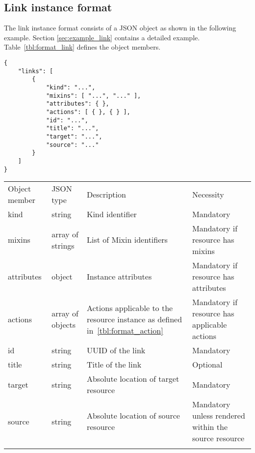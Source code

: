 \documentclass[10pt,a4paper]{article}
\begin{document}
\subsection{Link instance format}
\label{sec:format_link}

The link instance format consists of a JSON object as shown in the
following example. Section \ref{sec:example_link} contains a detailed example.
Table~\ref{tbl:format_link} defines the object members.
\begin{verbatim}
{
    "links": [
        {
            "kind": "...",
            "mixins": [ "...", "..." ],
            "attributes": { },
            "actions": [ { }, { } ],
            "id": "...",
            "title": "...",
            "target": "...",
            "source": "..."
        }
    ]
}
\end{verbatim}
 {
    \begin{tabular}{llp{5.0cm}p{3.0cm}}
    \toprule
    Object member & JSON type & Description & Necessity \\
    \colrule
    kind & string & Kind identifier & Mandatory \\

    mixins & array of strings & List of Mixin identifiers &
    Mandatory if resource has mixins \\

    attributes & object & Instance attributes & Mandatory if resource has attributes \\

    actions & array of objects & Actions applicable to the resource instance as defined in~\ref{tbl:format_action} &
    Mandatory if resource has applicable actions \\
    
    id & string & UUID of the link & Mandatory\\
        
    title & string & Title of the link & Optional\\
        
    target & string & Absolute location of target resource & Mandatory \\
    
    source & string & Absolute location of source resource & Mandatory unless rendered within the source resource\\
    \botrule
    \end{tabular}
}
\end{document}
